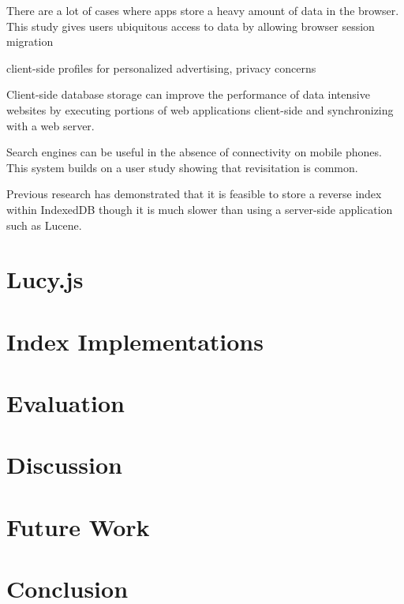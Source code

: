 \documentclass{vldb}
\begin{document}
There are a lot of cases where apps store a heavy amount of data in the browser. This study gives users ubiquitous access to data by allowing browser session migration \cite{lo2013imagen}

client-side profiles for personalized advertising, privacy concerns \cite{bilenko2011predictive}

Client-side database storage can improve the performance of data intensive websites by executing portions of web applications client-side and synchronizing with a web server.
\cite{benson2010sync}


Search engines can be useful in the absence of connectivity on mobile phones. This system builds on a user study showing that revisitation is common.
\cite{balasubramanian2012findall}

Previous research has demonstrated that it is feasible to store a reverse index within IndexedDB
\cite{lin:jscene} though it is much slower than using a server-side application such as Lucene.




\section{Lucy.js}



\section{Index Implementations}



\section{Evaluation}


\section{Discussion}

\section{Future Work}

\section{Conclusion}



 
\end{document}
